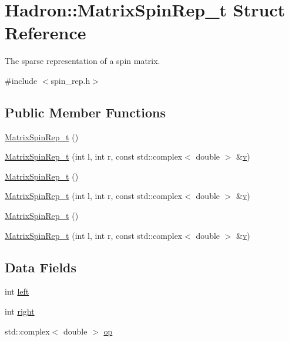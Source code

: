 \hypertarget{structHadron_1_1MatrixSpinRep__t}{}\section{Hadron\+:\+:Matrix\+Spin\+Rep\+\_\+t Struct Reference}
\label{structHadron_1_1MatrixSpinRep__t}


The sparse representation of a spin matrix.  




{\ttfamily \#include $<$spin\+\_\+rep.\+h$>$}

\subsection*{Public Member Functions}
\begin{DoxyCompactItemize}
\item 
\mbox{\hyperlink{structHadron_1_1MatrixSpinRep__t_a38258a85d8bc13c1f94ef0958795a49e}{Matrix\+Spin\+Rep\+\_\+t}} ()
\item 
\mbox{\hyperlink{structHadron_1_1MatrixSpinRep__t_a3a057c50dbc88ead180122518485973c}{Matrix\+Spin\+Rep\+\_\+t}} (int l, int r, const std\+::complex$<$ double $>$ \&\mbox{\hyperlink{adat__devel_2lib_2hadron_2hadron__timeslice_8cc_a716fc87f5e814be3ceee2405ed6ff22a}{v}})
\item 
\mbox{\hyperlink{structHadron_1_1MatrixSpinRep__t_a38258a85d8bc13c1f94ef0958795a49e}{Matrix\+Spin\+Rep\+\_\+t}} ()
\item 
\mbox{\hyperlink{structHadron_1_1MatrixSpinRep__t_a3a057c50dbc88ead180122518485973c}{Matrix\+Spin\+Rep\+\_\+t}} (int l, int r, const std\+::complex$<$ double $>$ \&\mbox{\hyperlink{adat__devel_2lib_2hadron_2hadron__timeslice_8cc_a716fc87f5e814be3ceee2405ed6ff22a}{v}})
\item 
\mbox{\hyperlink{structHadron_1_1MatrixSpinRep__t_a38258a85d8bc13c1f94ef0958795a49e}{Matrix\+Spin\+Rep\+\_\+t}} ()
\item 
\mbox{\hyperlink{structHadron_1_1MatrixSpinRep__t_a3a057c50dbc88ead180122518485973c}{Matrix\+Spin\+Rep\+\_\+t}} (int l, int r, const std\+::complex$<$ double $>$ \&\mbox{\hyperlink{adat__devel_2lib_2hadron_2hadron__timeslice_8cc_a716fc87f5e814be3ceee2405ed6ff22a}{v}})
\end{DoxyCompactItemize}
\subsection*{Data Fields}
\begin{DoxyCompactItemize}
\item 
int \mbox{\hyperlink{structHadron_1_1MatrixSpinRep__t_ab2c703ae13c904d3f0401fed64b05f83}{left}}
\item 
int \mbox{\hyperlink{structHadron_1_1MatrixSpinRep__t_a8c99524ce50d315e915216514946d5ec}{right}}
\item 
std\+::complex$<$ double $>$ \mbox{\hyperlink{structHadron_1_1MatrixSpinRep__t_aebc25f04c53c0422ab31366020649dad}{op}}
\end{DoxyCompactItemize}


